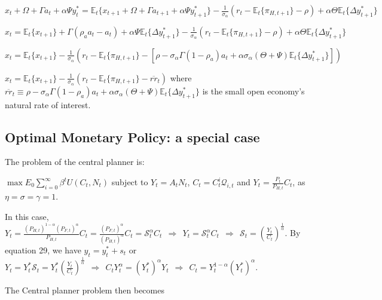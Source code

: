 \documentclass[
]{article}
\begin{document}
\(x_t + \Omega+\Gamma a_t+ \alpha \Psi y_t^* = \mathbb{E}_t\{x_{t+1} + \Omega+\Gamma a_{t+1}+ \alpha \Psi y_{t+1}^*\} -\frac{1}{\sigma_\alpha}(r_t-\mathbb{E}_t\{\pi_{H,t+1}\} -\rho)+ \alpha \Theta \mathbb{E}_t\{\Delta y_{t+1}^*\}\)

\(\displaystyle x_t = \mathbb{E}_t\{x_{t+1}\} +\Gamma (\rho_a a_{t}-a_t)+ \alpha \Psi \mathbb{E}_t\{\Delta y_{t+1}^*\} -\frac{1}{\sigma_\alpha}(r_t-\mathbb{E}_t\{\pi_{H,t+1}\} -\rho)+ \alpha \Theta \mathbb{E}_t\{\Delta y_{t+1}^*\}\)

\(\displaystyle x_t = \mathbb{E}_t\{x_{t+1}\} -\frac{1}{\sigma_\alpha}(r_t-\mathbb{E}_t\{\pi_{H,t+1}\} -[\rho-\sigma_\alpha \Gamma (1-\rho_a)a_t +\alpha \sigma_\alpha(\Theta+\Psi) \mathbb{E}_t\{\Delta y_{t+1}^*\}])\)

\(\displaystyle x_t = \mathbb{E}_t\{x_{t+1}\} -\frac{1}{\sigma_\alpha}(r_t-\mathbb{E}_t\{\pi_{H,t+1}\} -\overline{rr}_t)\)
where
\(\overline{rr}_t \equiv \rho-\sigma_\alpha \Gamma (1-\rho_a)a_t +\alpha \sigma_\alpha(\Theta+\Psi) \mathbb{E}_t\{\Delta y_{t+1}^*\}\)
is the small open economy's natural rate of interest.

\vspace{12pt}

\hypertarget{optimal-monetary-policy-a-special-case}{%
\subsection{Optimal Monetary Policy: a special
case}\label{optimal-monetary-policy-a-special-case}}

The problem of the central planner is:

\(\displaystyle \max E_0\sum_{i=0}^\infty \beta^t U(C_t,N_t)\) subject
to \(Y_t=A_tN_t\), \(\displaystyle C_t=C_t^i\mathcal{Q}_{i,t}\) and
\(\displaystyle Y_t=\frac{P_t}{P_{H,t}} C_t\), as
\(\eta=\sigma=\gamma=1\).

In this case,
\(\displaystyle Y_t=\frac{(P_{H,t})^{1-\alpha}(P_{F,t})^{\alpha}}{P_{H,t}} C_t = \frac{(P_{F,t})^{\alpha}}{(P_{H,t})^{\alpha}}C_t=\mathcal{S}_t^{\alpha}C_t \ \ \Rightarrow \ \ Y_t=\mathcal{S}_t^{\alpha}C_t \ \ \Rightarrow \ \ \mathcal{S}_t= \left( \frac{Y_t}{C_t} \right)^{\frac{1}{\alpha}}\).
By equation 29, we have \(y_t=y_t^*+s_t\) or
\(\displaystyle Y_t=Y_t^{*} \mathcal{S}_t= Y_t^{*} \left( \frac{Y_t}{C_t} \right)^{\frac{1}{\alpha}} \ \ \Rightarrow \ \ C_t Y_t^\alpha = (Y_t^*)^\alpha Y_t \ \ \Rightarrow \ \ C_t=Y_t^{1-\alpha}(Y_t^*)^\alpha\).

The Central planner problem then becomes
\end{document}
